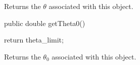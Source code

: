 \begin{tabb}
   Returns the $\theta$ associated with this object.
\end{tabb}
\begin{code}

   public double getTheta0()\begin{hide} {
      return theta_limit;
   }\end{hide}
\end{code}
\begin{tabb}
   Returns the $\theta_0$ associated with this object.
\end{tabb}
\begin{code}\begin{hide}
}\end{hide}
\end{code}
